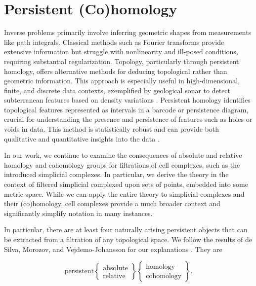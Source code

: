 \section{Persistent (Co)homology}
Inverse problems primarily involve inferring geometric shapes from measurements like path integrals. Classical methods such as Fourier transforms provide extensive information but struggle with nonlinearity and ill-posed conditions, requiring substantial regularization. Topology, particularly through persistent homology, offers alternative methods for deducing topological rather than geometric information. This approach is especially useful in high-dimensional, finite, and discrete data contexts, exemplified by geological sonar to detect subterranean features based on density variations \cite[§1]{de2011dualities}. Persistent homology identifies topological features represented as intervals in a barcode or persistence diagram, crucial for understanding the presence and persistence of features such as holes or voids in data. This method is statistically robust and can provide both qualitative and quantitative insights into the data  \cite{chazal2014persistence,chazal2009proximity}.

In our work, we continue to examine the consequences of absolute and relative homology and cohomology groups for filtrations of cell complexes, such as the introduced simplicial complexes. In particular, we derive the theory in the context of filtered simplicial complexed upon sets of points, embedded into some metric space. While we can apply the entire theory to simplicial complexes and their (co)homology, cell complexes provide a much broader context and significantly simplify notation in many instances.

In particular, there are at least four naturally arising persistent objects that can be extracted from a filtration of any topological space. We follow the results of de Silva, Morozov, and Vejdemo-Johansson for our explanations \cite[§1]{de2011dualities}. They are

\begin{equation*}
\text{persistent}
\begin{Bmatrix} \text{absolute} \\ \text{relative} \end{Bmatrix}
\begin{Bmatrix} \text{homology} \\ \text{cohomology} \end{Bmatrix}.
\end{equation*}

